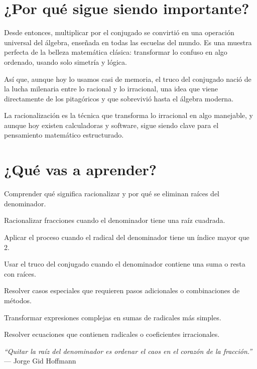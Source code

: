 \section*{¿Por qué sigue siendo importante?}

\begin{reseñaplana}
Desde entonces, multiplicar por el conjugado se convirtió en una operación universal del álgebra, enseñada en todas las 
escuelas del mundo. Es una muestra perfecta de la belleza matemática clásica: transformar lo confuso en algo ordenado, 
usando solo simetría y lógica.

Así que, aunque hoy lo usamos casi de memoria, el truco del conjugado nació de la lucha milenaria entre lo racional y 
lo irracional, una idea que viene directamente de los pitagóricos y que sobrevivió hasta el álgebra moderna.

La racionalización es la técnica que transforma lo irracional en algo manejable, y aunque hoy existen calculadoras 
y software, sigue siendo clave para el pensamiento matemático estructurado.
\end{reseñaplana}

\section*{¿Qué vas a aprender?}
\begin{aprende}
  \item Comprender qué significa racionalizar y por qué se eliminan raíces del denominador.
  \item Racionalizar fracciones cuando el denominador tiene una raíz cuadrada.
  \item Aplicar el proceso cuando el radical del denominador tiene un índice mayor que 2.
  \item Usar el truco del conjugado cuando el denominador contiene una suma o resta con raíces.
  \item Resolver casos especiales que requieren pasos adicionales o combinaciones de métodos.
  \item Transformar expresiones complejas en sumas de radicales más simples.
  \item Resolver ecuaciones que contienen radicales o coeficientes irracionales.
\end{aprende}

\vspace{1cm}
\begin{flushright}
  {\oneptup\itshape ``Quitar la raíz del denominador es ordenar el caos en el corazón de la fracción.''}\\
  {\oneptup — Jorge Gid Hoffmann}
\end{flushright}